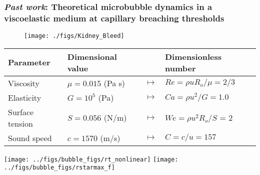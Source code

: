 \begin{frame} \frametitle{\textit{Past work}: Theoretical microbubble dynamics in a viscoelastic medium at capillary breaching thresholds}
  \vspace*{\fill}
  \begin{minipage}{\textwidth}
    \begin{minipage}{0.3\textwidth}
      \begin{figure}
        \centering
        \texttt{[image: ./figs/Kidney\_Bleed]}
      \end{figure}
    \end{minipage}
    \begin{minipage}{0.68\linewidth}
      {\tiny
        \vspace*{2pt}

        \vspace*{0.5cm}
        \begin{tabular}{l l c l}
          Parameter & Dimensional value & & Dimensionless number \\ \hline
          Viscosity & $\mu=0.015$ (Pa s) & $\mapsto$ & $Re=\rho u R_o / \mu = 2/3$ \\
          Elasticity & $G=10^5$ (Pa) & $\mapsto$ & $Ca= \rho u^2 / G = 1.0$ 	\\
          Surface tension & $S=0.056$ (N/m) & $\mapsto$ & $We=\rho u^2 R_o / S$ = 2 \\
          Sound speed & $c=1570$ (m/s) & $\mapsto$ & $C = c/u=157$ \\  
        \end{tabular} 
      }
    \end{minipage}
  \end{minipage}

  \vfill

  \begin{minipage}{\textwidth}
    \texttt{[image: ../figs/bubble\_figs/rt\_nonlinear]}\hfill
    \texttt{[image: ../figs/bubble\_figs/rstarmax\_f]}  
  \end{minipage}
  \vfill
\end{frame}
